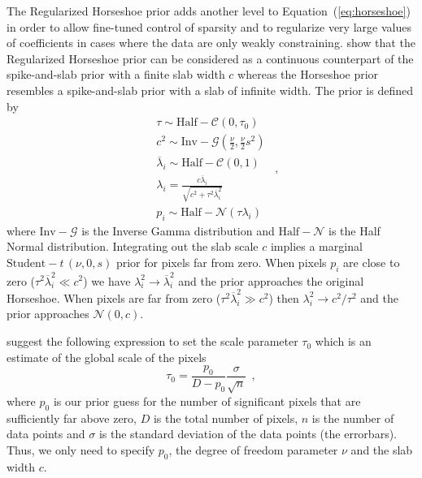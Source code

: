 \documentclass[12pt,dvipsnames]{report}
\newcommand{\hquad}{~~}
\begin{document}
The Regularized Horseshoe prior adds another level to Equation~(\ref{eq:horseshoe}) in order to allow fine-tuned control of sparsity and to regularize very large values of coefficients in cases where the data are only weakly constraining.
\citet{10.1214/17-EJS1337SI} show that the Regularized Horseshoe prior can be considered as a continuous counterpart of the spike-and-slab prior with a finite slab width $c$ whereas the Horseshoe prior resembles a spike-and-slab prior with a slab of infinite width.
The prior is defined by
\begin{equation}
\begin{aligned}
    &\tau  \sim \mathrm{Half}-\mathcal{C}\left(0, \tau_{0}\right)\\
    &c^{2}  \sim \mathrm{Inv}-\mathcal{G}\left(\frac{\nu}{2}, \frac{\nu}{2} s^{2}\right) \\
    &\overline{\lambda}_{i}  \sim \mathrm{Half}-\mathcal{C}(0,1)\\
    &\lambda_{i} =\frac{c \overline{\lambda}_{i}}{\sqrt{c^{2}+\tau^{2} \overline{\lambda}_{i}^{2}}} \\
    &p_{i}  \sim \mathrm{Half}-\mathcal{N}\left(\tau \lambda_{i}\right) 
\end{aligned}
\hquad,
    \label{eq:reg_horseshoe}
\end{equation}
where $\mathrm{Inv}-\mathcal{G}$ is the Inverse Gamma distribution and  $\mathrm{Half}-\mathcal{N}$ is the Half Normal distribution.
Integrating out the slab scale $c$ implies a marginal $\mathrm{Student}-\mathit{t}\,(\nu,0,s)$ prior for pixels far from zero.
When pixels $p_i$ are close to zero ($\tau^2\overline{\lambda}_i^2\ll c^2$) we have $\lambda_i^2\rightarrow\overline{\lambda}_i^2$ and the prior approaches the original Horseshoe.
When pixels are far from zero ($\tau^2\overline{\lambda}_i^2\gg c^2$) then $\lambda_i^2\rightarrow c^2/\tau^2$ and the prior approaches $\mathcal{N}(0, c)$.

\citet{10.1214/17-EJS1337SI} suggest the following expression to set the scale parameter $\tau_0$ which is an estimate of the global scale of the pixels 
\begin{equation}
    \tau_0=\frac{p_0}{D-p_0}\frac{\sigma}{\sqrt{n}}
    \hquad,
    \label{eq:horseshoe_tau0}
\end{equation}
where $p_0$ is our prior guess for the number of significant pixels that are sufficiently far above zero, $D$ is the total number of pixels, $n$ is the number of data points and $\sigma$ is the standard deviation of the data points (the errorbars).
Thus, we only need to specify $p_0$, the degree of freedom parameter $\nu$ and the slab width $c$.
\end{document}
